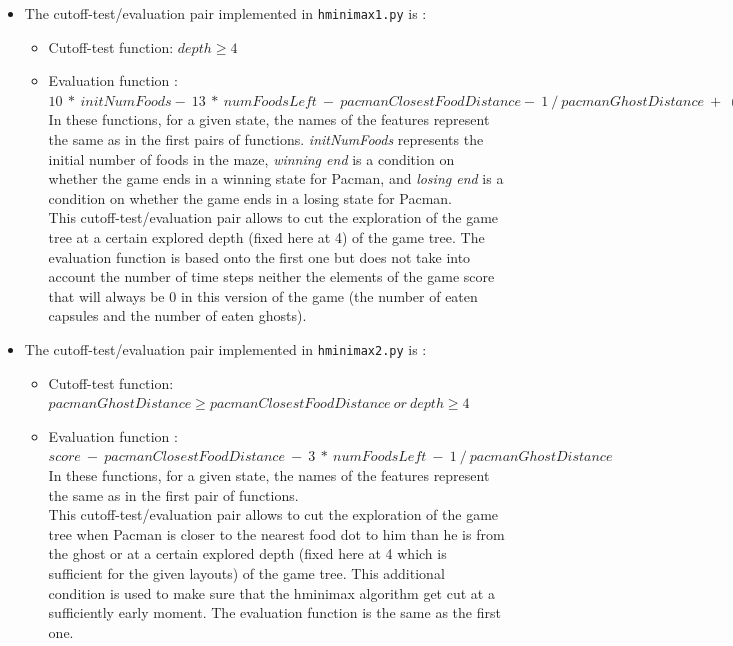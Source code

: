 \documentclass{article}
\begin{document}
\begin{enumerate}[label=\alph*.,leftmargin=*]
\begin{itemize}
			\item The cutoff-test/evaluation pair implemented in \texttt{hminimax1.py} is :
				\begin{itemize}
					\item Cutoff-test function: $depth \geq 4$
					\item Evaluation function : $10 \ * \ initNumFoods - \ 13 \ * \ numFoodsLeft \ - \ pacmanClosestFoodDistance - \ 1 \ / \ pacmanGhostDistance \ + \ (500 \ if \ winning \ end) \ + \ (-500 \ if \ losing \ end)$ \\
				
					In these functions, for a given state, the names of the features represent the same as in the first pairs of functions. \textit{initNumFoods} represents the initial number of foods in the maze, \textit{winning end} is a condition on whether the game ends in a winning state for Pacman, and \textit{losing end} is a condition on whether the game ends in a losing state for Pacman.\\
				
					This cutoff-test/evaluation pair allows to cut the exploration of the game tree at a certain explored depth (fixed here at 4) of the game tree. The evaluation function is based onto the first one but does not take into account the number of time steps neither the elements of the game score that will always be 0 in this version of the game (the number of eaten capsules and the number of eaten ghosts).\\
				\end{itemize}
				
		\item The cutoff-test/evaluation pair implemented in \texttt{hminimax2.py} is :
				\begin{itemize}
					\item Cutoff-test function: $pacmanGhostDistance \geq pacmanClosestFoodDistance \ or \ depth \geq 4$
					\item Evaluation function : $score \ - \ pacmanClosestFoodDistance \ - \ 3 \ * \ numFoodsLeft \ - \ 1 \ / \ pacmanGhostDistance$\\
				
					In these functions, for a given state, the names of the features represent the same as in the first pair of functions.\\
				
					This cutoff-test/evaluation pair allows to cut the exploration of the game tree when Pacman is closer to the nearest food dot to him than he is from the ghost or at a certain explored depth (fixed here at 4 which is sufficient for the given layouts) of the game tree. This additional condition is used to make sure that the hminimax algorithm get cut at a sufficiently early moment. The evaluation function is the same as the first one.\\
				\end{itemize}
				
		\end{itemize}
\end{enumerate}
\end{document}
